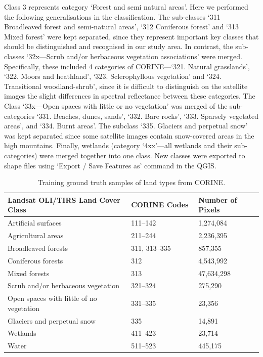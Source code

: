 \documentclass[jimaging,article,accept,pdftex,oneauthor]{Definitions/mdpi}
\begin{document}
{Class 3 represents} category `Forest and semi natural areas'. Here we performed the following generalisations in the classification. The sub-classes `311 Broadleaved forest and semi-natural areas', `312 Coniferous forest' and `313 Mixed forest' were kept separated, since they represent important key classes that should be {distinguished and recognised in our study area}. In contrast, the sub-classes `32x---Scrub and/or herbaceous vegetation associations' were merged. Specifically, these included 4 categories of CORINE---`321. Natural grasslands', `322. Moors and heathland', `323. Sclerophyllous vegetation' and `324. Transitional woodland-shrub', since it is difficult to distinguish on the satellite images the slight differences in spectral reflectance between these categories. The Class `33x---Open spaces with little or no vegetation' was merged of the sub-categories `331. Beaches, dunes, sands', `332. Bare rocks', `333. Sparsely vegetated areas', and `334. Burnt areas'. The subclass `335. Glaciers and perpetual snow' was kept separated since some satellite {images contain snow-covered areas} in the high mountains. {Finally, wetlands (category `4xx'---all wetlands and their sub-categories) were merged together into one class. New classes were exported to shape files using `Export / Save Features as' command in the QGIS}.

\begin{table}[H]
\caption{Training ground truth samples of land types from CORINE.}\label{tab02}%
\small
\begin{tabularx}{\textwidth}{lll}
\toprule
\textbf{Landsat OLI/TIRS Land Cover Class} & \textbf{CORINE Codes} & \textbf{Number of Pixels}  \\
\midrule
        Artificial surfaces & 111--142 & 1,274,084 \\ \midrule
        Agricultural areas & 211--244 & 2,236,395  \\ \midrule
        Broadleaved forests & %
311, 313--335 & 857,355  \\ \midrule
        Coniferous forests & 312 & 4,543,992  \\ \midrule
        Mixed forests & 313 & 47,634,298  \\ \midrule
        Scrub and/or herbaceous vegetation & 321--324 & 275,290  \\ \midrule
        Open spaces with little of no vegetation & 331--335 & 23,356  \\ \midrule
        Glaciers and perpetual snow & 335~~~~~~~~~~~~~~ & 14,891  \\  \midrule
        Wetlands & 411--423 & 23,714  \\ \midrule
	Water & 511--523 & 445,175  \\
\bottomrule
\end{tabularx}
\end{table}
\end{document}
